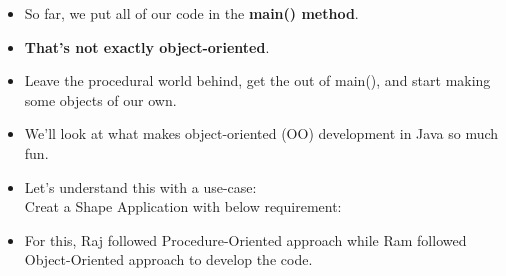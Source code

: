 
\begin{flushleft}
	\begin{itemize}
		
		\item So far, we put all of our code in the \textbf{main() method}. 
		\item \textbf{That’s not exactly object-oriented}. 
		\item Leave the procedural world behind, get the out of main(), and start making some objects of our own. 
		\item We’ll look at what makes object-oriented (OO) development in Java so much fun. 
		\item Let’s understand this with a use-case:  \\
		Creat a Shape Application with below requirement:
		
		
		\item For this, Raj followed Procedure-Oriented approach while Ram followed Object-Oriented approach to develop the code.
		
		\newpage
		

\end{itemize}
\end{flushleft}

